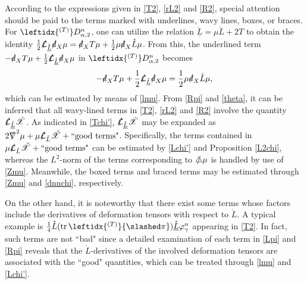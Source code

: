 \documentclass[11pt,twoside]{article}
\def\al{\alpha}
\begin{document}
\begin{enumerate}
According to the expressions given in \eqref{T2}, \eqref{rL2} and \eqref{R2}, special attention should be {paid} to the terms marked with underlines, wavy lines, boxes, or braces. For $\leftidx{^{(T)}}D_{\al,2}^{n}$, one can utilize the relation $\mathring{\underline L} = \mu\mathring L + 2T$ to obtain the identity $\frac{1}{2}\slashed{\mathcal L}_{\mathring{\underline L}}\slashed d_X\mu = \slashed d_XT\mu + \frac{1}{2}\mu\slashed d_X\mathring L\mu$. From this, the underlined term $-\slashed d_XT\mu + \frac{1}{2}\slashed{\mathcal L}_{\mathring{\underline L}}\slashed d_X\mu$ in $\leftidx{^{(T)}}D_{\al,2}^{n}$ becomes
\begin{equation}\label{Y-25}
-\slashed d_XT\mu + \frac{1}{2}\slashed{\mathcal L}_{\mathring{\underline L}}\slashed d_X\mu = \frac{1}{2}\mu\slashed d_X\mathring L\mu,
\end{equation}
which can be estimated by means of \eqref{lmu}.
From \eqref{Rpi} and \eqref{theta}, it can be inferred that all wavy-lined terms in \eqref{T2}, \eqref{rL2} and \eqref{R2} involve the quantity $\slashed{\mathcal L}_{\mathring{\underline L}}\check{\mathscr X}$. As indicated in \eqref{Tchi'}, $\slashed{\mathcal L}_{\mathring{\underline L}}\check{\mathscr X}$ may be expanded as $2\slashed\nabla^2\mu + \mu\slashed{\mathcal L}_{\mathring{L}}\check{\mathscr X}+ \text{``good terms"}$. Specifically, the terms contained in $\mu\slashed{\mathcal L}_{\mathring{L}}\check{\mathscr X}+\text{``good terms"}$ can be estimated by \eqref{Lchi'} and Proposition \ref{L2chi}, whereas the $L^2$-norm of the terms corresponding to $\slashed\triangle\mu$ is handled
by use of \eqref{Zmu}.
Meanwhile, the boxed terms and braced terms may be estimated through \eqref{Zmu} and \eqref{dnnchi}, respectively.

On the other hand, it is noteworthy that there exist some terms whose factors include the derivatives of deformation tensors with respect to $\mathring L$. A typical example is $\frac{1}{4}\mathring L(\operatorname{tr}\leftidx{^{(T)}}{\slashed\pi})\underline{\mathring L}\varphi_\gamma^n$ appearing in \eqref{T2}. In fact, such terms are not ``bad" since a detailed examination of each term in \eqref{Lpi} and \eqref{Rpi} reveals that the $\mathring L$-derivatives of the involved deformation tensors are associated with the ``good" quantities, which can be treated through \eqref{lmu} and \eqref{Lchi'}.


\end{enumerate}
\end{document}
